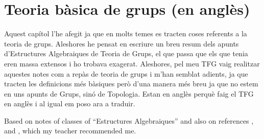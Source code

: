 \documentclass[../main.tex]{subfiles}
\begin{document}
\chapter{Teoria bàsica de grups (en anglès)}

Aquest capítol l'he afegit ja que en molts temes es tracten coses referents a la teoria de grups. Aleshores he pensat en escriure un breu resum dels apunts d'Estructures Algebraiques de Teoria de Grups, el que passa que els que tenia eren massa extensos i ho trobava exagerat. Aleshores, pel meu TFG vaig realitzar aquestes notes com a repàs de teoria de grups i m'han semblat adients, ja que tracten les definicions més bàsiques però d'una manera més breu ja que no estem en uns apunts de Grups, sinó de Topologia. Estan en anglès perquè faig el TFG en anglès i al igual em poso ara a traduir. 

Based on notes of classes of ``Estructures Algebraiques'' and also on references \cite{rotmanadvancedmodernalgebra}, \cite{hungerfordalgebra} and \cite{dummitfooteabstractalgebra}, which my teacher recommended me.







\end{document}
